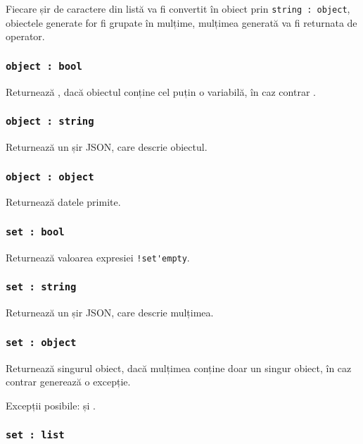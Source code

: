 Fiecare șir de caractere din listă va fi convertit în obiect prin \lstinline|string : object|, obiectele generate for fi grupate în mulțime, mulțimea generată va fi returnata de operator.

\subsubsection{\lstinline|object : bool|}

Returnează \true, dacă obiectul conține cel puțin o variabilă, în caz contrar \false.

\subsubsection{\lstinline|object : string|}

Returnează un șir JSON, care descrie obiectul.

\subsubsection{\lstinline|object : object|}

Returnează datele primite.

\subsubsection{\lstinline|set : bool|}

Returnează valoarea expresiei \lstinline|!set'empty|.

\subsubsection{\lstinline|set : string|}

Returnează un șir JSON, care descrie mulțimea.

\subsubsection{\lstinline|set : object|}

Returnează singurul obiect, dacă mulțimea conține doar un singur obiect, în caz contrar generează o excepție.

Excepții posibile:  și .

\subsubsection{\lstinline|set : list|}

